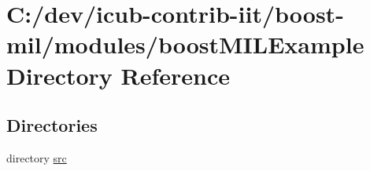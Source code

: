 \section{C\+:/dev/icub-\/contrib-\/iit/boost-\/mil/modules/boost\+M\+I\+L\+Example Directory Reference}
\label{dir_e71cd8fcd235e4fb369ba65b13bae578}
\subsection*{Directories}
\begin{DoxyCompactItemize}
\item 
directory \hyperlink{dir_7706fa3758ab12232cfaf1962d284f36}{src}
\end{DoxyCompactItemize}
